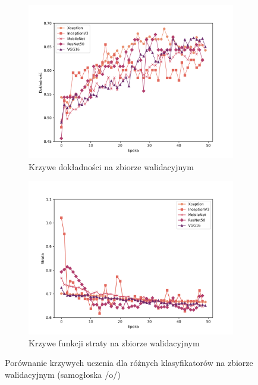 \begin{figure}[ht]
    \centering
    \begin{subfigure}{0.49\textwidth}
        \centering
        \includegraphics[width=\textwidth]{./img/results/o_acc}
        \caption{Krzywe dokładności na zbiorze walidacyjnym\@}
        \label{fig:o_acc}
    \end{subfigure}
    \begin{subfigure}{0.49\textwidth}
        \centering
        \includegraphics[width=\textwidth]{./img/results/o_loss}
        \caption{Krzywe funkcji straty na zbiorze walidacyjnym\@}
        \label{fig:o_loss}
    \end{subfigure}

    \caption{Porównanie krzywych uczenia dla różnych klasyfikatorów na zbiorze walidacyjnym (samogłoska /o/)}
    \label{fig:o_results}
\end{figure}

